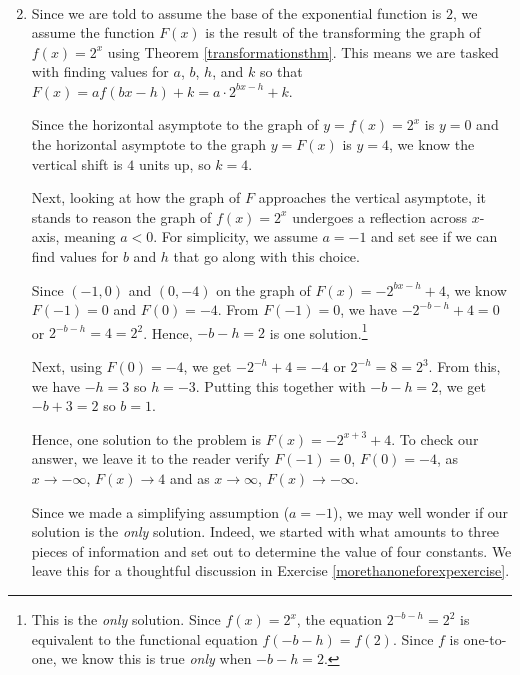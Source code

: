 \begin{ex}
\begin{enumerate}
\begin{enumerate}
\[\begin{array}{ccc}
\end{array}\]

\end{enumerate}

\item Since we are told to assume the base of the exponential function is $2$, we assume the function $F(x)$ is the result of the transforming the graph of $f(x) = 2^{x}$ using Theorem \ref{transformationsthm}.  This means we are tasked with finding values for $a$, $b$, $h$, and $k$ so that $F(x) = af(bx-h)+k = a \cdot 2^{bx-h} + k$.  

\smallskip

Since the horizontal asymptote to the graph of $y=f(x) = 2^{x}$ is $y=0$ and the horizontal asymptote to the graph $y = F(x)$ is $y=4$, we know the vertical shift is $4$ units up, so $k = 4$.  

\smallskip

Next, looking at how the graph of $F$ approaches the vertical asymptote, it stands to reason  the graph of $f(x) = 2^{x}$ undergoes a reflection across  $x$-axis,  meaning $a<0$.   For simplicity, we assume  $a = -1$ and set see if we can find values for  $b$ and $h$ that go along with this choice.

\smallskip

Since  $(-1,0)$ and $(0,-4)$ on the graph of $F(x) = - 2^{bx-h} + 4$, we know $F(-1) = 0$ and $F(0) = -4$.  From $F(-1)=0$, we have $-2^{-b-h} +4= 0$ or $2^{-b-h} = 4 = 2^2$. Hence, $-b-h = 2$ is one solution.\footnote{This is the \textit{only} solution. Since $f(x) = 2^{x}$, the equation $2^{-b-h} =  2^2$ is equivalent to the functional equation $f(-b-h) = f(2)$.  Since $f$ is one-to-one, we know this is true \textit{only} when $-b-h = 2$.}

\smallskip

Next, using $F(0) = -4$, we get $-2^{-h} +4 = -4$ or $2^{-h} = 8 = 2^{3}$.  From this, we have $-h = 3$ so $h = -3$.  Putting this together with $-b-h = 2$, we get $-b+3 = 2$ so $b = 1$.

\smallskip

Hence, one solution to the problem is $F(x) = -2^{x+3} + 4$.  To check our answer, we leave it to the reader verify $F(-1) = 0$, $F(0) = -4$, as $x \rightarrow -\infty$, $F(x) \rightarrow 4$ and as $x \rightarrow \infty$, $F(x) \rightarrow -\infty$.  

\smallskip

Since we made a simplifying assumption ($a = -1$), we may well wonder if our solution is the  \textit{only} solution.  Indeed, we started with what amounts to three pieces of information and set out to determine the value of four constants.  We leave this for a thoughtful discussion in Exercise \ref{morethanoneforexpexercise}.

\end{enumerate}

\end{ex}

